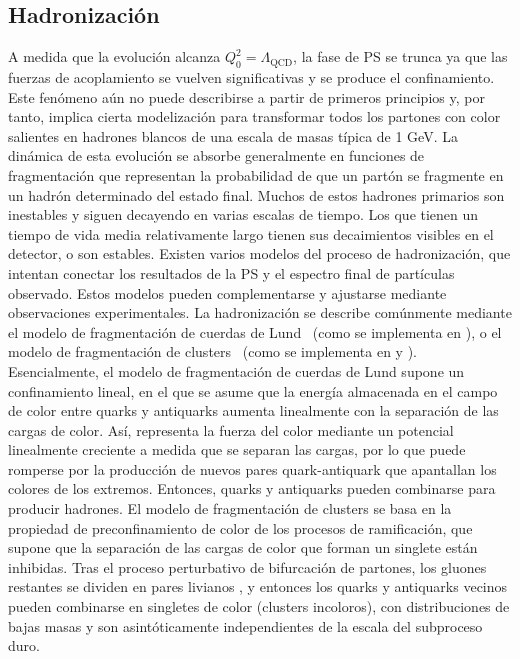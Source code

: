 \subsection{Hadronizaci\'on}
\label{subsec:theory:mc_simulation:hadronisation}

A medida que la evolución alcanza \(Q^2_0 = \Lambda_{\text{QCD}} \), la fase de \ac{PS} se trunca ya que las fuerzas de acoplamiento se vuelven significativas y se produce el confinamiento. Este fenómeno aún no puede describirse a partir de primeros principios y, por tanto, implica cierta modelización para transformar todos los partones con color salientes en hadrones blancos de una escala de masas típica de 1 GeV. La dinámica de esta evolución se absorbe generalmente en funciones de fragmentación que representan la probabilidad de que un partón se fragmente en un hadrón determinado del estado final. Muchos de estos hadrones primarios son inestables y siguen decayendo en varias escalas de tiempo. Los que tienen un tiempo de vida media relativamente largo tienen sus decaimientos visibles en el detector, o son estables. Existen varios modelos del proceso de hadronización, que intentan conectar los resultados de la \ac{PS} y el espectro final de partículas observado. Estos modelos pueden complementarse y ajustarse mediante observaciones experimentales. La hadronización se describe comúnmente mediante el modelo de fragmentación de cuerdas de Lund~\cite{Anderson-1983} (como se implementa en \Pythia), o el modelo de fragmentación de clusters~\cite{Webber-1984} (como se implementa en \Herwig y \Sherpa). Esencialmente, el modelo de fragmentación de cuerdas de Lund supone un confinamiento lineal, en el que se asume que la energía almacenada en el campo de color entre quarks y antiquarks aumenta linealmente con la separación de las cargas de color. Así, representa la fuerza del color mediante un potencial linealmente creciente a medida que se separan las cargas, por lo que puede romperse por la producción de nuevos pares quark-antiquark que apantallan los colores de los extremos. Entonces, quarks y antiquarks pueden combinarse para producir hadrones. El modelo de fragmentación de clusters se basa en la propiedad de preconfinamiento de color de los procesos de ramificación, que supone que la separación de las cargas de color que forman un singlete están inhibidas. Tras el proceso perturbativo de bifurcación de partones, los gluones restantes se dividen en pares livianos \qqbar, y entonces los quarks y antiquarks vecinos pueden combinarse en singletes de color (clusters incoloros), con distribuciones de bajas masas y son asintóticamente independientes de la escala del subproceso duro.


